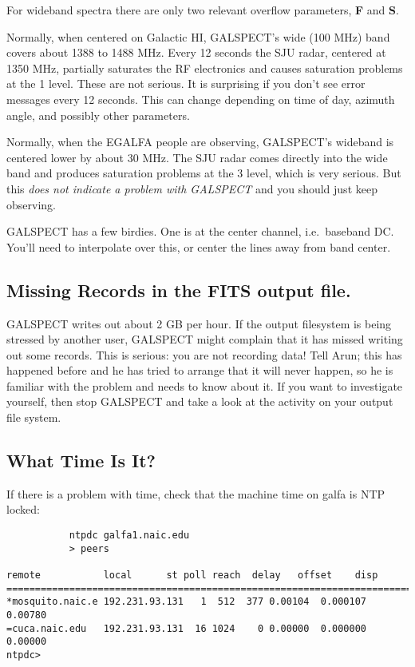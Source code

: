 \documentclass[psfig,preprint]{aastex}
\begin{document}
\noindent For wideband spectra there are only two relevant overflow
parameters, {\bf F} and {\bf S}. 

	Normally, when centered on Galactic HI, GALSPECT's wide (100
MHz) band covers about 1388 to 1488 MHz. Every 12 seconds the SJU radar,
centered at 1350 MHz, partially saturates the RF electronics and causes
saturation problems at the 1 level. These are not serious. It is
surprising if you don't see error messages every 12 seconds.  This can
change depending on time of day, azimuth angle, and possibly other
parameters.

	Normally, when the EGALFA people are observing, GALSPECT's
wideband is centered lower by about 30 MHz. The SJU radar comes directly
into the wide band and produces saturation problems at the 3 level,
which is very serious. But this {\it does not indicate a problem with
GALSPECT} and you should just keep observing. 

	GALSPECT has a few birdies. One is at the center channel, i.e.\
baseband DC. You'll need to interpolate over this, or center the lines
away from band center.

\subsection{Missing Records in the FITS output file.} GALSPECT writes
out about 2 GB per hour. If the output filesystem is being stressed by
another user, GALSPECT might complain that it has missed writing out
some records. This is serious: you are not recording data! Tell Arun;
this has happened before and he has tried to arrange that it will never
happen, so he is familiar with the problem and needs to know about it. 
If you want to investigate yourself, then stop GALSPECT and take a look
at the activity on your output file system. 

\subsection{What Time Is It?}


	If there is a problem with time, check that the machine time on
galfa is NTP locked:

\begin{verbatim}
           ntpdc galfa1.naic.edu
           > peers

remote           local      st poll reach  delay   offset    disp
=======================================================================
*mosquito.naic.e 192.231.93.131   1  512  377 0.00104  0.000107 0.00780
=cuca.naic.edu   192.231.93.131  16 1024    0 0.00000  0.000000 0.00000
ntpdc>

\end{verbatim} 
\end{document}
